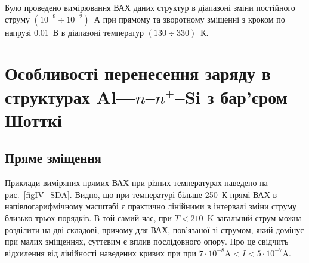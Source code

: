 



Було проведено вимірювання ВАХ даних структур в діапазоні зміни постійного струму $(10^{-9}\div10^{-2})$~А при
прямому та зворотному зміщенні з кроком по напрузі 0.01~В в діапазоні температур $(130\div330)$~К.


\section{Особливості перенесення заряду в структурах Al---$n$--$n^+$--Si з бар'єром Шотткі\label{MSSi_Non}}
\subsection{Пряме зміщення\label{sbMSSi_NonF}}


Приклади виміряних прямих ВАХ при різних температурах наведено на рис.~\ref{figIV_SDA}.
Видно, що при температурі більше 250~К прямі ВАХ в напівлогарифмічному масштабі є практично лінійними в інтервалі зміни струму близько трьох порядків.
В той самий час, при $T<210$~K загальний струм можна розділити на дві складові, причому для ВАХ, пов'язаної зі струмом,
який домінує при малих зміщеннях, суттєвим є вплив послідовного опору.
Про це свідчить відхилення від лінійності наведених кривих при при $7\cdot10^{-8}\mbox{A}<I<5\cdot10^{-7}\mbox{A}$.

